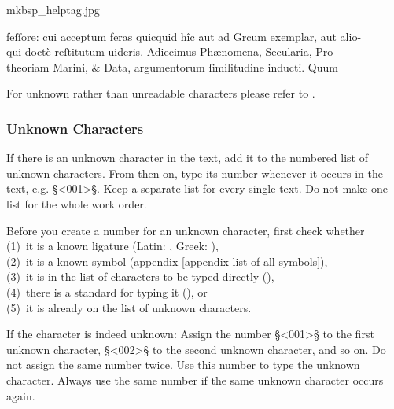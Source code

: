 \begin{sampleImage}{mkbsp_helptag.jpg}

\begin{typeLatin}
 \someText
feſſore: cui acceptum feras quicquid hîc aut ad Grcum exemplar, aut alio-\\
qui doctè reſtitutum uideris. Adiecimus Phænomena, Secularia, Pro-\\
theoriam Marini, & Data, argumentorum ſimilitudine inducti. Quum
\someText {}
\end{typeLatin}
\end{sampleImage}

\begin{crossref}
For unknown rather than unreadable characters please refer to .
\end{crossref}


\subsubsection{Unknown Characters}
\label{section unknown characters}

\begin{mainrule}
If there is an unknown character in the text, add it to the numbered
list of unknown characters. From then on, type its number whenever it
occurs in the text, e.g. §<001>§. Keep a separate list for every
single text. Do not make one list for the whole work order.
\end{mainrule}

\begin{clarification}
Before you create a number for an unknown character, first check whether \\
(1)~it is a known ligature (Latin: , Greek: ), \\
(2)~it is a known symbol (appendix \ref{appendix list of all symbols}), \\
(3)~it is in the list of characters to be typed directly (), \\
(4)~there is a standard for typing it (), or \\
(5)~it is already on the list of unknown characters.
 \end{clarification}

\begin{clarification}
If the character is indeed unknown: Assign the number §<001>§ to the first unknown character, §<002>§ to the second unknown character, and so on. Do not assign the same number twice. Use this number to type the unknown character. Always use the same number if the same unknown character occurs again.
\end{clarification}

